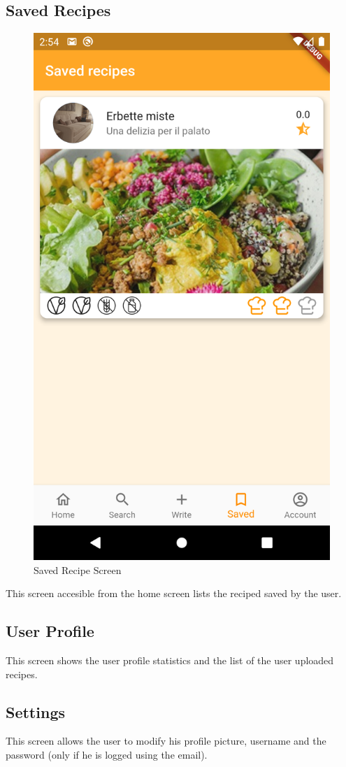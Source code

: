 \subsection{Saved Recipes}
\begin{figure}[H]
	\centering
	\includegraphics{img/Saved.png}
	\caption{Saved Recipe Screen}
\end{figure}
This screen accesible from the home screen lists the reciped saved by the user.
\subsection{User Profile}
This screen shows the user profile statistics and the list of the user uploaded recipes.
\subsection{Settings}
This screen allows the user to modify his profile picture, username and the password (only if he is logged using the email).